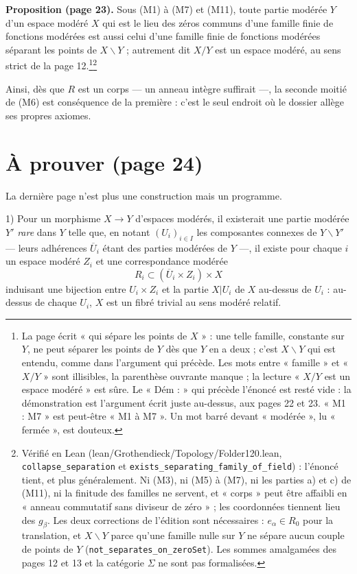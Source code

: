 \documentclass[11pt,a4paper]{article}
\begin{document}
\textbf{Proposition (page 23).} Sous (M1) à (M7) et (M11), toute partie modérée
$Y$ d'un espace modéré $X$ qui est le lieu des zéros communs d'une famille
finie de fonctions modérées est aussi celui d'une famille finie de fonctions
modérées séparant les points de $X \smallsetminus Y$ ; autrement dit $X/Y$ est
un espace modéré, au sens strict de la page 12.\footnote{La page écrit
« qui sépare les points de $X$ » : une telle famille, constante sur $Y$, ne
peut séparer les points de $Y$ dès que $Y$ en a deux ; c'est $X \smallsetminus
Y$ qui est entendu, comme dans l'argument qui précède. Les mots entre
« famille » et « $X/Y$ » sont illisibles, la parenthèse ouvrante manque ; la
lecture « $X/Y$ est un espace modéré » est sûre. Le « Dém : » qui précède
l'énoncé est resté vide : la démonstration est l'argument écrit juste
au-dessus, aux pages 22 et 23. « M1 : M7 » est peut-être « M1 à M7 ». Un mot
barré devant « modérée », lu « fermée », est douteux.}\footnote{Vérifié en
Lean (lean/Grothendieck/Topology/Folder120.lean, \texttt{collapse\_separation} et
\texttt{exists\_separating\_family\_of\_field}) : l'énoncé tient, et plus
généralement. Ni (M3), ni (M5) à (M7), ni les parties a) et c) de (M11), ni la
finitude des familles ne servent, et « corps » peut être affaibli en « anneau
commutatif sans diviseur de zéro » ; les coordonnées tiennent lieu des
$g_\beta$. Les deux corrections de l'édition sont nécessaires : $e_\alpha \in
R_0$ pour la translation, et $X \smallsetminus Y$ parce qu'une famille nulle
sur $Y$ ne sépare aucun couple de points de $Y$
(\texttt{not\_separates\_on\_zeroSet}). Les sommes amalgamées des pages 12 et
13 et la catégorie $\Sigma$ ne sont pas formalisées.}

Ainsi, dès que $R$ est un corps --- un anneau intègre suffirait ---, la
seconde moitié de (M6) est conséquence de la première : c'est le seul endroit où le dossier allège ses propres axiomes.

\section*{À prouver (page 24)}

La dernière page n'est plus une construction mais un programme.

1) Pour un morphisme $X \to Y$ d'espaces modérés, il existerait une partie
modérée $Y'$ \emph{rare} dans $Y$ telle que, en notant $(U_i)_{i \in I}$ les
composantes connexes de $Y \smallsetminus Y'$ — leurs adhérences
$\overline{U}_i$ étant des parties modérées de $Y$ —, il existe pour chaque
$i$ un espace modéré $Z_i$ et une correspondance modérée
\[ R_i \subset (\overline{U}_i \times Z_i) \times X \]
induisant une bijection entre $U_i \times Z_i$ et la partie $X|U_i$ de $X$
au-dessus de $U_i$ : au-dessus de chaque $U_i$, $X$ est un fibré trivial au
sens modéré relatif.
\end{document}
